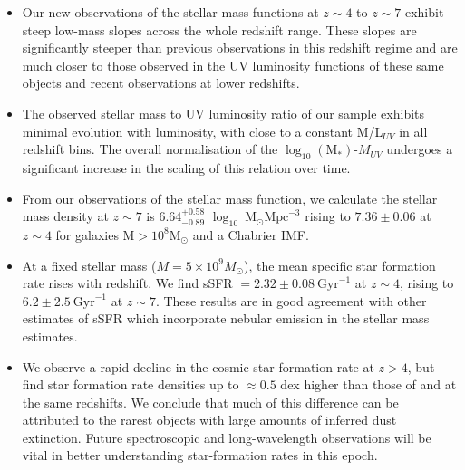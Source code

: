 \begin{itemize}
  \item Our new observations of the stellar mass functions at $z \sim 4$ to $z \sim 7$ exhibit steep low-mass slopes across the whole redshift range. These slopes are significantly steeper than previous observations in this redshift regime and are much closer to those observed in the UV luminosity functions of these same objects and recent observations at lower redshifts.  
  \item The observed stellar mass to UV luminosity ratio of our sample exhibits minimal evolution with luminosity, with close to a constant M/L$_{UV}$ in all redshift bins. The overall normalisation of the $\log_{10} (\text{M}_{*})$-$M_{UV}$ undergoes a significant increase in the scaling of this relation over time.
  \item From our observations of the stellar mass function, we calculate the stellar mass density at $z \sim 7$ is $6.64^{+0.58}_{-0.89}$ $\log_{10}~\text{M}_{\odot} \text{Mpc}^{-3}$ rising to $7.36\pm0.06$ at $z \sim 4$ for galaxies M$> 10^8 \text{M}_{\odot}$ and a Chabrier IMF.
  \item At a fixed stellar mass ($M = 5 \times 10^9 M_{\odot}$), the mean specific star formation rate rises with redshift. We find sSFR $= 2.32\pm0.08~\text{Gyr}^{-1}$ at $z \sim 4$, rising to $6.2\pm2.5~\text{Gyr}^{-1}$ at $z \sim 7$. These results are in good agreement with other estimates of sSFR which incorporate nebular emission in the stellar mass estimates. 
  \item We observe a rapid decline in the cosmic star formation rate at $z > 4$, but find star formation rate densities up to $\approx 0.5$ dex higher than those of \citet{2012ApJ...754...83B} and \citet{Smit:2012is} at the same redshifts. We conclude that much of this difference can be attributed to the rarest objects with large amounts of inferred dust extinction. Future spectroscopic and long-wavelength observations will be vital in better understanding star-formation rates in this epoch. 
\end{itemize}



